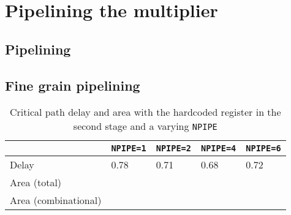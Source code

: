 \chapter{Pipelining the multiplier}
\section{Pipelining}

\section{Fine grain pipelining}
\begin{table}
	
	\begin{tabular}{|l|l|l|l|l|}
	\hline
	&\texttt{NPIPE=1} & \texttt{NPIPE=2} & \texttt{NPIPE=4} & \texttt{NPIPE=6}\\\hline
	Delay & 0.78 & 0.71 & 0.68 & 0.72 \\\hline
	Area (total) & & & & \\\hline
	Area (combinational) & & & & \\\hline
	\end{tabular}

	\caption{Critical path delay and area with the hardcoded register in the second stage and a varying \texttt{NPIPE}}
	\label{tab:stage2}
\end{table}